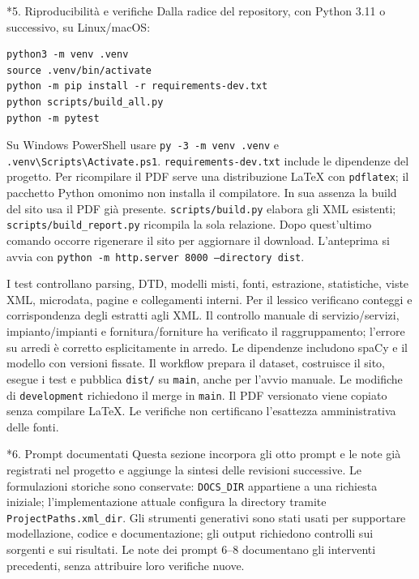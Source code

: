 \documentclass[10pt,a4paper]{article}
\makeatletter
\newcommand{\code}[1]{\texttt{#1}}
\renewcommand\section{\@startsection{section}{1}{0pt}{8pt}{4pt}{\large\bfseries}}
\makeatother
\begin{document}
\newpage
\section*{5. Riproducibilità e verifiche}
Dalla radice del repository, con Python 3.11 o successivo, su Linux/macOS:
\begin{verbatim}
python3 -m venv .venv
source .venv/bin/activate
python -m pip install -r requirements-dev.txt
python scripts/build_all.py
python -m pytest
\end{verbatim}
Su Windows PowerShell usare \code{py -3 -m venv .venv} e \code{.venv\textbackslash Scripts\textbackslash Activate.ps1}. \code{requirements-dev.txt} include le dipendenze del progetto. Per ricompilare il PDF serve una distribuzione LaTeX con \code{pdflatex}; il pacchetto Python omonimo non installa il compilatore. In sua assenza la build del sito usa il PDF già presente. \code{scripts/build.py} elabora gli XML esistenti; \code{scripts/build\_report.py} ricompila la sola relazione. Dopo quest'ultimo comando occorre rigenerare il sito per aggiornare il download. L'anteprima si avvia con \code{python -m http.server 8000 --directory dist}.

I test controllano parsing, DTD, modelli misti, fonti, estrazione, statistiche, viste XML, microdata, pagine e collegamenti interni. Per il lessico verificano conteggi e corrispondenza degli estratti agli XML. Il controllo manuale di servizio/servizi, impianto/impianti e fornitura/forniture ha verificato il raggruppamento; l'errore su arredi è corretto esplicitamente in arredo. Le dipendenze includono spaCy e il modello con versioni fissate. Il workflow prepara il dataset, costruisce il sito, esegue i test e pubblica \code{dist/} su \code{main}, anche per l’avvio manuale. Le modifiche di \code{development} richiedono il merge in \code{main}. Il PDF versionato viene copiato senza compilare LaTeX. Le verifiche non certificano l'esattezza amministrativa delle fonti.

\section*{6. Prompt documentati}
Questa sezione incorpora gli otto prompt e le note già registrati nel progetto e aggiunge la sintesi delle revisioni successive. Le formulazioni storiche sono conservate: \code{DOCS\_DIR} appartiene a una richiesta iniziale; l'implementazione attuale configura la directory tramite \code{ProjectPaths.xml\_dir}. Gli strumenti generativi sono stati usati per supportare modellazione, codice e documentazione; gli output richiedono controlli sui sorgenti e sui risultati. Le note dei prompt 6--8 documentano gli interventi precedenti, senza attribuire loro verifiche nuove.
\end{document}
